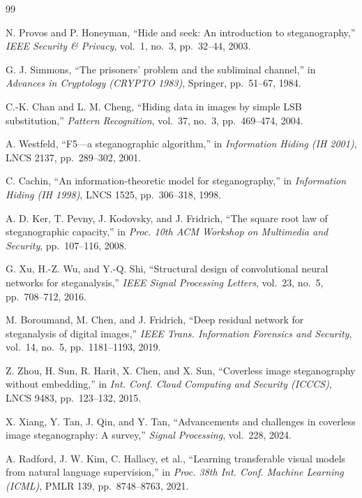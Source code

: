 \documentclass[11pt]{article}
\theoremstyle{definition}
\begin{document}
\begingroup
\fontsize{12}{14.4}\selectfont
\begin{thebibliography}{99}

N. Provos and P. Honeyman,
``Hide and seek: An introduction to steganography,''
\emph{IEEE Security \& Privacy}, vol.~1, no.~3, pp.~32--44, 2003.

G. J. Simmons,
``The prisoners' problem and the subliminal channel,''
in \emph{Advances in Cryptology (CRYPTO 1983)}, Springer, pp.~51--67, 1984.

C.-K. Chan and L. M. Cheng,
``Hiding data in images by simple LSB substitution,''
\emph{Pattern Recognition}, vol.~37, no.~3, pp.~469--474, 2004.

A. Westfeld,
``F5---a steganographic algorithm,''
in \emph{Information Hiding (IH 2001)}, LNCS 2137, pp.~289--302, 2001.

C. Cachin,
``An information-theoretic model for steganography,''
in \emph{Information Hiding (IH 1998)}, LNCS 1525, pp.~306--318, 1998.

A. D. Ker, T. Pevny, J. Kodovsky, and J. Fridrich,
``The square root law of steganographic capacity,''
in \emph{Proc. 10th ACM Workshop on Multimedia and Security}, pp.~107--116, 2008.

G. Xu, H.-Z. Wu, and Y.-Q. Shi,
``Structural design of convolutional neural networks for steganalysis,''
\emph{IEEE Signal Processing Letters}, vol.~23, no.~5, pp.~708--712, 2016.

M. Boroumand, M. Chen, and J. Fridrich,
``Deep residual network for steganalysis of digital images,''
\emph{IEEE Trans. Information Forensics and Security}, vol.~14, no.~5, pp.~1181--1193, 2019.

Z. Zhou, H. Sun, R. Harit, X. Chen, and X. Sun,
``Coverless image steganography without embedding,''
in \emph{Int. Conf. Cloud Computing and Security (ICCCS)}, LNCS 9483, pp.~123--132, 2015.

X. Xiang, Y. Tan, J. Qin, and Y. Tan,
``Advancements and challenges in coverless image steganography: A survey,''
\emph{Signal Processing}, vol.~228, 2024.

A. Radford, J. W. Kim, C. Hallacy, et al.,
``Learning transferable visual models from natural language supervision,''
in \emph{Proc. 38th Int. Conf. Machine Learning (ICML)}, PMLR 139, pp.~8748--8763, 2021.


\end{thebibliography}
\end{document}

